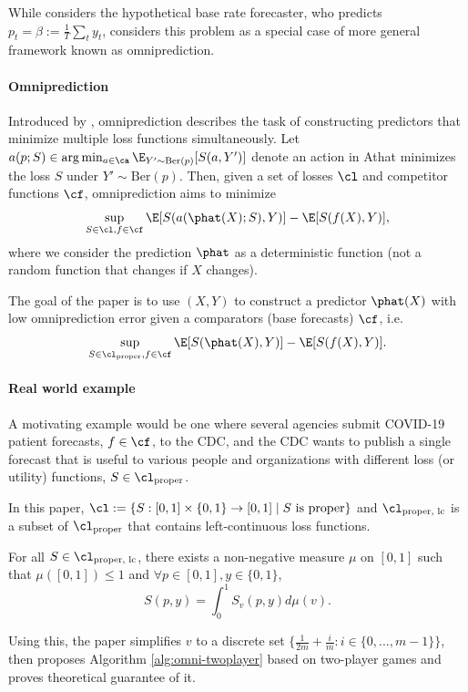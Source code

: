 While \cite{kleinberg2023ucal} considers the hypothetical base rate forecaster, who predicts $p_t=\beta:=\frac{1}{T}\sum_t y_t$, \cite{isaac2025omni} considers this problem as a special case of more general framework known as omniprediction.

\paragraph{Omniprediction} Introduced by \cite{gopalan2022omnipredictors}, omniprediction describes the task of constructing predictors that minimize multiple loss functions simultaneously. 
Let $a(p;S) \in \arg\min_{a\in\ca} \E_{Y'\sim\text{Ber}(p)}[S(a,Y')]$ denote an action in Athat minimizes the loss $S$ under $Y'\sim\text{Ber}(p)$. 
Then, given a set of losses $\cl$ and competitor functions $\cf$, omniprediction aims to minimize
\[
\sup_{S\in\cl, f\in\cf} \E[S(a(\phat(X);S), Y)] - \E[S(f(X), Y)],
\]
where we consider the prediction $\phat$ as a deterministic function (not a random function that changes if $X$ changes).

The goal of the paper is to use $(X,Y)$ to construct a predictor $\phat(X)$ with low omniprediction error given a comparators (base forecasts) $\cf$, i.e.
\[
\sup_{S\in\cl_{\text{proper}}, f\in\cf} \E[S(\phat(X), Y)] - \E[S(f(X), Y)].
\]

\paragraph{Real world example}
A motivating example would be one where several agencies submit COVID-19 patient forecasts, $f\in \cf$, to the CDC, and the CDC wants to publish a single forecast that is useful to various people and organizations with different loss (or utility) functions, $S \in \cl_{\text{proper}}$.

In this paper, $\cl := \{S:[0,1]\times \{0,1\} \to [0,1] \mid S \text{ is proper}\}$ and $\cl_{\text{proper, lc}}$ is a subset of $\cl_{\text{proper}}$ that contains left-continuous loss functions. 

\begin{theorem}
    For all $S \in \cl_{\text{proper, lc}}$, there exists a non-negative measure $\mu$ on $[0,1]$ such that $\mu([0,1])\leq 1$ and $\forall p \in [0,1], y \in \{0,1\}$,
    \[
    S(p, y) = \int_0^1 S_v(p,y)d\mu(v).
    \]
\end{theorem}
Using this, the paper simplifies $v$ to a discrete set $\{\frac{1}{2m}+\frac{i}{m}: i \in \{0, ..., m-1\}\}$, then proposes Algorithm \ref{alg:omni-twoplayer} based on two-player games and proves theoretical guarantee of it.

